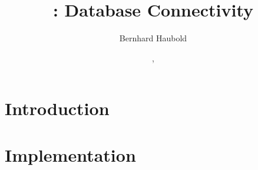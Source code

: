 \documentclass[a4paper]{report}
\begin{document}
\pagestyle{noweb}

\title{: Database Connectivity\\\scriptsize {}}
\author{Bernhard Haubold}
\date{\hspace{-3pt}, }
\maketitle

\tableofcontents

\chapter{Introduction}

\chapter{Implementation}

\end{document}
